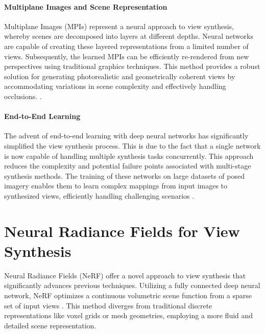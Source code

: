 \paragraph{Multiplane Images and Scene Representation}
Multiplane Images (MPIs) represent a neural approach to view synthesis, whereby scenes are decomposed into layers at different depths.
Neural networks are capable of creating these layered representations from a limited number of views.
Subsequently, the learned MPIs can be efficiently re-rendered from new perspectives using traditional graphics techniques.
This method provides a robust solution for generating photorealistic and geometrically coherent views by accommodating variations in scene complexity and effectively handling occlusions. \cite{mildenhall_local_2019,penner_soft_2017,pratul_p_srinivasan_pushing_2019,tao_zhou_stereo_2018}.

\paragraph{End-to-End Learning}
The advent of end-to-end learning with deep neural networks has significantly simplified the view synthesis process. This is due to the fact that a single network is now capable of handling multiple synthesis tasks concurrently.
This approach reduces the complexity and potential failure points associated with multi-stage synthesis methods.
The training of these networks on large datasets of posed imagery enables them to learn complex mappings from input images to synthesized views, efficiently handling challenging scenarios \cite{chen_photographic_2017,flynn_deep_2016}.

\section{Neural Radiance Fields for View Synthesis}

Neural Radiance Fields (NeRF) offer a novel approach to view synthesis that significantly advances previous techniques.
Utilizing a fully connected deep neural network, NeRF optimizes a continuous volumetric scene function from a sparse set of input views \cite{mildenhall_nerf_2021}.
This method diverges from traditional discrete representations like voxel grids or mesh geometries, employing a more fluid and detailed scene representation.

